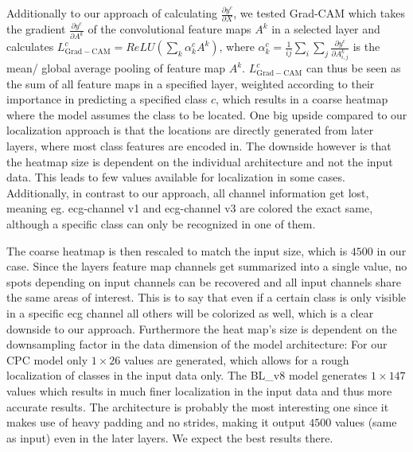 Additionally to our approach of calculating $\frac{\partial y^c}{\partial X}$, we tested Grad-CAM \autocite{DBLP:journals/corr/SelvarajuDVCPB16} which takes the gradient $\frac{\partial y^c}{\partial A^k}$ of the convolutional feature maps $A^k$ in a selected layer and calculates $L^c_{\mathrm{Grad-CAM}} = \mathit{ReLU}\left(\sum_{k}\alpha^c_k A^k\right)$, where $\alpha^c_k=\frac{1}{ij}\sum_i\sum_j\frac{\partial y^c}{\partial A^k_{i,j}}$ is the mean/ global average pooling of feature map $A^k$. $L^c_{\mathrm{Grad-CAM}}$ can thus be seen as the sum of all feature maps in a specified layer, weighted according to their importance in predicting a specified class $c$, which results in a coarse heatmap where the model assumes the class to be located. One big upside compared to our localization approach is that the locations are directly generated from later layers, where most class features are encoded in. The downside however is that the heatmap size is dependent on the individual architecture and not the input data. This leads to few values available for localization in some cases. Additionally, in contrast to our approach, all channel information get lost, meaning eg. ecg-channel v1 and ecg-channel v3 are colored the exact same, although a specific class can only be recognized in one of them.

The coarse heatmap is then rescaled to match the input size, which is $4500$ in our case. Since the layers feature map channels get summarized into a single value, no spots depending on input channels can be recovered and all input channels share the same areas of interest. This is to say that even if a certain class is only visible in a specific ecg channel all others will be colorized as well, which is a clear downside to our approach. Furthermore the heat map's size is dependent on the downsampling factor in the data dimension of the model architecture: For our  CPC model only $1\times26$ values are generated, which allows for a rough localization of classes in the input data only. The BL\_v8 model generates $1\times147$ values which results in much finer localization in the input data and thus more accurate results. The  architecture is probably the most interesting one since it makes use of heavy padding and no strides, making it output $4500$ values (same as input) even in the later layers. We expect the best results there.

